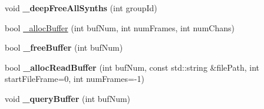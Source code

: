 \begin{DoxyCompactItemize}
\item 
\hypertarget{classColliderPlusPlus_1_1Client__Server_a0c39de34592133a18a977a967bd1dc7a}{void {\bfseries \-\_\-deep\-Free\-All\-Synths} (int group\-Id)}\label{classColliderPlusPlus_1_1Client__Server_a0c39de34592133a18a977a967bd1dc7a}

\item 
bool \hyperlink{classColliderPlusPlus_1_1Client__Server_aade82fef586a608c0d7ee84addc7c6c1}{\-\_\-alloc\-Buffer} (int buf\-Num, int num\-Frames, int num\-Chans)
\item 
\hypertarget{classColliderPlusPlus_1_1Client__Server_acae8664fb2626d8e3a608b079e63ebf6}{bool {\bfseries \-\_\-free\-Buffer} (int buf\-Num)}\label{classColliderPlusPlus_1_1Client__Server_acae8664fb2626d8e3a608b079e63ebf6}

\item 
\hypertarget{classColliderPlusPlus_1_1Client__Server_a55b2f23d98d10f62e90b6c551f95bee4}{bool {\bfseries \-\_\-alloc\-Read\-Buffer} (int buf\-Num, const std\-::string \&file\-Path, int start\-File\-Frame=0, int num\-Frames=-\/1)}\label{classColliderPlusPlus_1_1Client__Server_a55b2f23d98d10f62e90b6c551f95bee4}

\item 
\hypertarget{classColliderPlusPlus_1_1Client__Server_a009b94661bc4072d8ad198101aed1536}{void {\bfseries \-\_\-query\-Buffer} (int buf\-Num)}\label{classColliderPlusPlus_1_1Client__Server_a009b94661bc4072d8ad198101aed1536}

\end{DoxyCompactItemize}


